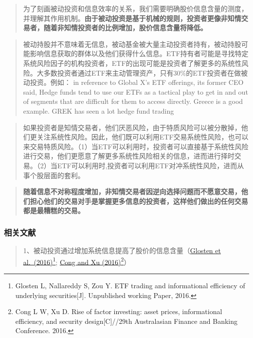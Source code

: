 \documentclass[
]{article}
\begin{document}
\begin{quote}
为了刻画被动投资和信息效率的关系，我们需要明确股价信息含量的测度，并理解其作用机制。\textbf{由于被动投资是基于机械的规则，投资者更像非知情交易者，随着非知情投资者的比例增加，股价信息含量将降低。}
\end{quote}

\begin{quote}
被动持股并不意味着无信息，被动基金被大量主动投资者持有，被动持股可能影响信息获取的群体以及他们获得什么信息。ETF持有者可能是寻找特定系统风险因子的机构投资者，ETF的出现可能是投资者了解更多的系统性风险。大多数投资者通过ETF来主动管理资产，只有30\%的ETF投资者在做被动投资。例如：
in reference to Global X's ETF offerings, its former CEO said, Hedge
funds tend to use our ETFs as a tactical play to get in and out of
segments that are difficult for them to access directly. Greece is a
good example. GREK has seen a lot hedge fund trading
\end{quote}

\begin{quote}
如果投资者是知情交易者，他们厌恶风险，由于特质风险可以被分散掉，他们更关注系统性风险。因此，他们既可以利用ETF交易系统性风险，也可以来交易特质风险。（1）当ETF可以利用时，投资者可以直接基于系统性风险进行交易，他们更愿意了解更多系统性风险相关的信息，进而进行择时交易。（2）当ETF可以利用时,投资者可以利用ETF对冲系统性风险，进而从事个股层面的套利。
\end{quote}

\begin{quote}
\textbf{随着信息不对称程度增加，非知情交易者因逆向选择问题而不愿意交易，他们担心他们的交易对手是掌握更多信息的投资者，这样他们做出的任何交易都是最糟糕的交易。}
\end{quote}

\hypertarget{ux76f8ux5173ux6587ux732e-1}{%
\subsubsection{相关文献}\label{ux76f8ux5173ux6587ux732e-1}}

\begin{quote}
1、被动投资通过增加系统信息提高了股价的信息含量（\href{https://www.rhsmith.umd.edu/files/Documents/Departments/Finance/fall2015/glosten.pdf}{Glosten
et al.~(2016)}\footnote{Glosten L, Nallareddy S, Zou Y. ETF trading and
  informational efficiency of underlying securities{[}J{]}. Unpublished
  working Paper, 2016.};
\href{https://dx.doi.org/10.2139/ssrn.2800590}{Cong and Xu
(2016)}\footnote{Cong L W, Xu D. Rise of factor investing: asset prices,
  informational efficiency, and security design{[}C{]}//29th
  Australasian Finance and Banking Conference. 2016.}）
\end{quote}
\end{document}
